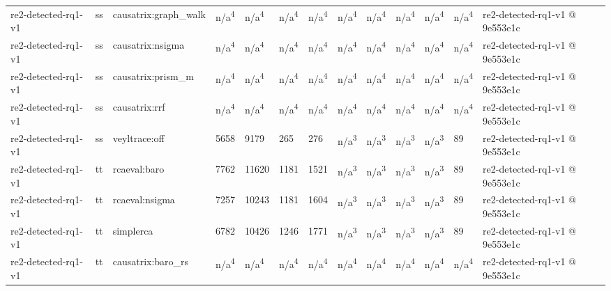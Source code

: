\begin{table}[t]
\begin{tabular}{lllllllllllll}
re2-detected-rq1-v1 & ss & causatrix:graph\_walk & n/a\textsuperscript{4} & n/a\textsuperscript{4} & n/a\textsuperscript{4} & n/a\textsuperscript{4} & n/a\textsuperscript{4} & n/a\textsuperscript{4} & n/a\textsuperscript{4} & n/a\textsuperscript{4} & n/a\textsuperscript{4} & re2-detected-rq1-v1 @ 9e553e1c \\
re2-detected-rq1-v1 & ss & causatrix:nsigma & n/a\textsuperscript{4} & n/a\textsuperscript{4} & n/a\textsuperscript{4} & n/a\textsuperscript{4} & n/a\textsuperscript{4} & n/a\textsuperscript{4} & n/a\textsuperscript{4} & n/a\textsuperscript{4} & n/a\textsuperscript{4} & re2-detected-rq1-v1 @ 9e553e1c \\
re2-detected-rq1-v1 & ss & causatrix:prism\_m & n/a\textsuperscript{4} & n/a\textsuperscript{4} & n/a\textsuperscript{4} & n/a\textsuperscript{4} & n/a\textsuperscript{4} & n/a\textsuperscript{4} & n/a\textsuperscript{4} & n/a\textsuperscript{4} & n/a\textsuperscript{4} & re2-detected-rq1-v1 @ 9e553e1c \\
re2-detected-rq1-v1 & ss & causatrix:rrf & n/a\textsuperscript{4} & n/a\textsuperscript{4} & n/a\textsuperscript{4} & n/a\textsuperscript{4} & n/a\textsuperscript{4} & n/a\textsuperscript{4} & n/a\textsuperscript{4} & n/a\textsuperscript{4} & n/a\textsuperscript{4} & re2-detected-rq1-v1 @ 9e553e1c \\
re2-detected-rq1-v1 & ss & veyltrace:off & 5658 & 9179 & 265 & 276 & n/a\textsuperscript{3} & n/a\textsuperscript{3} & n/a\textsuperscript{3} & n/a\textsuperscript{3} & 89 & re2-detected-rq1-v1 @ 9e553e1c \\
re2-detected-rq1-v1 & tt & rcaeval:baro & 7762 & 11620 & 1181 & 1521 & n/a\textsuperscript{3} & n/a\textsuperscript{3} & n/a\textsuperscript{3} & n/a\textsuperscript{3} & 89 & re2-detected-rq1-v1 @ 9e553e1c \\
re2-detected-rq1-v1 & tt & rcaeval:nsigma & 7257 & 10243 & 1181 & 1604 & n/a\textsuperscript{3} & n/a\textsuperscript{3} & n/a\textsuperscript{3} & n/a\textsuperscript{3} & 89 & re2-detected-rq1-v1 @ 9e553e1c \\
re2-detected-rq1-v1 & tt & simplerca & 6782 & 10426 & 1246 & 1771 & n/a\textsuperscript{3} & n/a\textsuperscript{3} & n/a\textsuperscript{3} & n/a\textsuperscript{3} & 89 & re2-detected-rq1-v1 @ 9e553e1c \\
re2-detected-rq1-v1 & tt & causatrix:baro\_rs & n/a\textsuperscript{4} & n/a\textsuperscript{4} & n/a\textsuperscript{4} & n/a\textsuperscript{4} & n/a\textsuperscript{4} & n/a\textsuperscript{4} & n/a\textsuperscript{4} & n/a\textsuperscript{4} & n/a\textsuperscript{4} & re2-detected-rq1-v1 @ 9e553e1c \\

\end{tabular}
\end{table}
